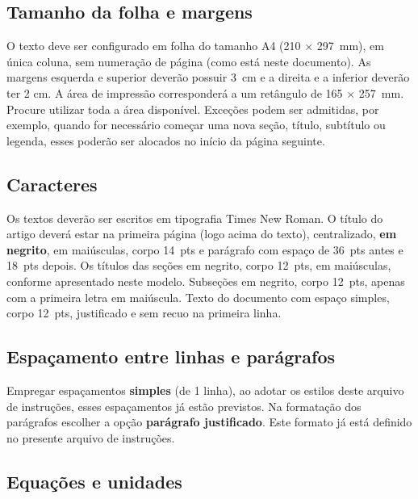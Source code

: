 \documentclass[12pt, a4paper, oneside, onecolumn] {article}%
\begin{document}
\subsection{Tamanho da folha e margens}

O texto deve ser configurado em folha do tamanho A4 (210 $\times$ 297~mm), em única coluna, sem numeração de página (como está neste documento). As margens esquerda e superior deverão possuir 3~cm e a direita e a inferior deverão ter 2 cm. A área de impressão corresponderá a um retângulo de 165 $\times$ 257~mm. Procure utilizar toda a área disponível. Exceções podem ser admitidas, por exemplo, quando for necessário começar uma nova seção, título, subtítulo ou legenda, esses poderão ser alocados no início da página seguinte.

\subsection{Caracteres}

Os textos deverão ser escritos em tipografia Times New Roman. O título do artigo deverá estar na primeira página (logo acima do texto), centralizado, \textbf{em negrito}, em maiúsculas, corpo 14~pts e parágrafo com espaço de 36~pts antes e 18~pts depois. Os títulos das seções em negrito, corpo 12~pts, em maiúsculas, conforme apresentado neste modelo. Subseções em negrito, corpo 12~pts, apenas com a primeira letra em maiúscula. Texto do documento com espaço simples, corpo 12~pts, justificado e sem recuo na primeira linha.

\subsection{Espaçamento entre linhas e parágrafos}

Empregar espaçamentos \textbf{simples} (de 1 linha), ao adotar os estilos deste arquivo de instruções, esses espaçamentos já estão previstos. Na formatação dos parágrafos escolher a opção \textbf{parágrafo justificado}. Este formato já está definido no presente arquivo de instruções. 

\subsection{Equações e unidades}
\end{document}
